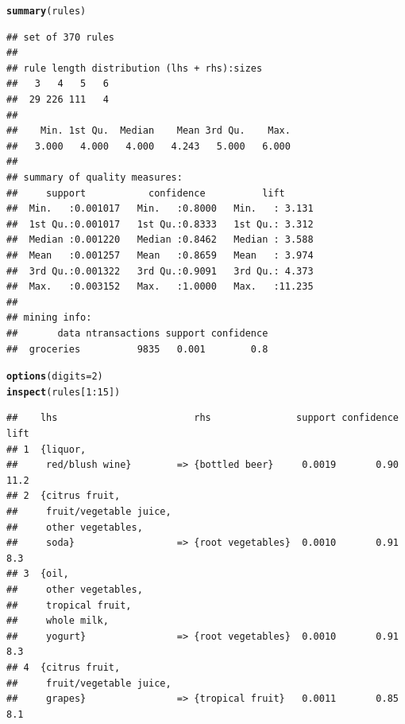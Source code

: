 \documentclass{article}\usepackage[]{graphicx}\usepackage[]{color}
\makeatletter
\newcommand{\hlnum}[1]{\textcolor[rgb]{0.686,0.059,0.569}{#1}}%
\newcommand{\hlopt}[1]{\textcolor[rgb]{0,0,0}{#1}}%
\newcommand{\hlstd}[1]{\textcolor[rgb]{0.345,0.345,0.345}{#1}}%
\newcommand{\hlkwc}[1]{\textcolor[rgb]{0.333,0.667,0.333}{#1}}%
\newcommand{\hlkwd}[1]{\textcolor[rgb]{0.737,0.353,0.396}{\textbf{#1}}}%
\newenvironment{kframe}{%
 \def\at@end@of@kframe{}%
 \ifinner\ifhmode%
  \def\at@end@of@kframe{\end{minipage}}%
  \begin{minipage}{\columnwidth}%
 \fi\fi%
 \def\FrameCommand##1{\hskip\@totalleftmargin \hskip-\fboxsep
 \colorbox{shadecolor}{##1}\hskip-\fboxsep
     \hskip-\linewidth \hskip-\@totalleftmargin \hskip\columnwidth}%
 \MakeFramed {\advance\hsize-\width
   \@totalleftmargin\z@ \linewidth\hsize
   \@setminipage}}%
 {\par\unskip\endMakeFramed%
 \at@end@of@kframe}
\newenvironment{knitrout}{}{} %
\makeatother
\begin{document}
\begin{knitrout}
\color{fgcolor}\begin{kframe}
\begin{alltt}
\hlkwd{summary}\hlstd{(rules)}
\end{alltt}
\begin{verbatim}
## set of 370 rules
## 
## rule length distribution (lhs + rhs):sizes
##   3   4   5   6 
##  29 226 111   4 
## 
##    Min. 1st Qu.  Median    Mean 3rd Qu.    Max. 
##   3.000   4.000   4.000   4.243   5.000   6.000 
## 
## summary of quality measures:
##     support           confidence          lift       
##  Min.   :0.001017   Min.   :0.8000   Min.   : 3.131  
##  1st Qu.:0.001017   1st Qu.:0.8333   1st Qu.: 3.312  
##  Median :0.001220   Median :0.8462   Median : 3.588  
##  Mean   :0.001257   Mean   :0.8659   Mean   : 3.974  
##  3rd Qu.:0.001322   3rd Qu.:0.9091   3rd Qu.: 4.373  
##  Max.   :0.003152   Max.   :1.0000   Max.   :11.235  
## 
## mining info:
##       data ntransactions support confidence
##  groceries          9835   0.001        0.8
\end{verbatim}
\begin{alltt}
\hlkwd{options}\hlstd{(}\hlkwc{digits}\hlstd{=}\hlnum{2}\hlstd{)}
\hlkwd{inspect}\hlstd{(rules[}\hlnum{1}\hlopt{:}\hlnum{15}\hlstd{])}
\end{alltt}
\begin{verbatim}
##    lhs                        rhs               support confidence lift
## 1  {liquor,                                                            
##     red/blush wine}        => {bottled beer}     0.0019       0.90 11.2
## 2  {citrus fruit,                                                      
##     fruit/vegetable juice,                                             
##     other vegetables,                                                  
##     soda}                  => {root vegetables}  0.0010       0.91  8.3
## 3  {oil,                                                               
##     other vegetables,                                                  
##     tropical fruit,                                                    
##     whole milk,                                                        
##     yogurt}                => {root vegetables}  0.0010       0.91  8.3
## 4  {citrus fruit,                                                      
##     fruit/vegetable juice,                                             
##     grapes}                => {tropical fruit}   0.0011       0.85  8.1

\end{verbatim}
\end{kframe}
\end{knitrout}
\end{document}
